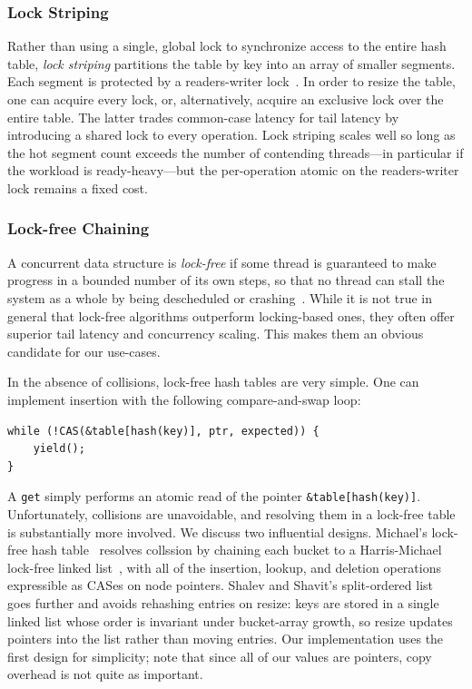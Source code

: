\subsubsection{Lock Striping}
Rather than using a single, global lock to synchronize access to the entire hash
table, \emph{lock striping} partitions the table by key into an array of smaller
segments. Each segment is protected by a readers-writer
lock~\cite{herlihy20art}. In order to resize the table, one can acquire every
lock, or, alternatively, acquire an exclusive lock over the entire table. The
latter trades common-case latency for tail latency by introducing a shared
lock to every operation. Lock striping scales well so long as the hot segment
count exceeds the number of contending threads---in particular if the workload
is ready-heavy---but the per-operation atomic on the readers-writer lock remains
a fixed cost.

\subsubsection{Lock-free Chaining}
A concurrent data structure is \emph{lock-free} if some thread is guaranteed to
make progress in a bounded number of its own steps, so that no thread can stall
the system as a whole by being descheduled or crashing~\cite{herlihy91waitfree}.
While it is not true in general that lock-free algorithms outperform
locking-based ones, they often offer superior tail latency and concurrency
scaling. This makes them an obvious candidate for our use-cases.

In the absence of collisions, lock-free hash tables are very simple. One can
implement insertion with the following compare-and-swap loop:
\begin{verbatim}
while (!CAS(&table[hash(key)], ptr, expected)) {
    yield();
}
\end{verbatim}

A \texttt{get} simply performs an atomic read of the pointer
\texttt{\&table[hash(key)]}. Unfortunately, collisions are unavoidable, and
resolving them in a lock-free table is substantially more involved. We discuss
two influential designs. Michael's lock-free hash table~\cite{michael02highperf}
resolves collssion by chaining each bucket to a Harris-Michael lock-free linked
list~\cite{harris01lockfree}, with all of the insertion, lookup, and deletion
operations expressible as CASes on node pointers. Shalev and Shavit's
split-ordered list~\cite{shalev06splitorder} goes further and avoids rehashing
entries on resize: keys are stored in a single linked list whose order is
invariant under bucket-array growth, so resize updates pointers into the
list rather than moving entries. Our implementation uses the first design for
simplicity; note that since all of our values are pointers, copy overhead is not
quite as important.

